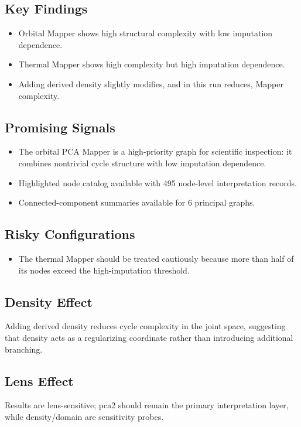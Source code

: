 \subsection*{Key Findings}
\begin{itemize}
\item Orbital Mapper shows high structural complexity with low imputation dependence.
\item Thermal Mapper shows high complexity but high imputation dependence.
\item Adding derived density slightly modifies, and in this run reduces, Mapper complexity.
\end{itemize}

\subsection*{Promising Signals}
\begin{itemize}
\item The orbital PCA Mapper is a high-priority graph for scientific inspection: it combines nontrivial cycle structure with low imputation dependence.
\item Highlighted node catalog available with 495 node-level interpretation records.
\item Connected-component summaries available for 6 principal graphs.
\end{itemize}

\subsection*{Risky Configurations}
\begin{itemize}
\item The thermal Mapper should be treated cautiously because more than half of its nodes exceed the high-imputation threshold.
\end{itemize}

\subsection*{Density Effect}
Adding derived density reduces cycle complexity in the joint space, suggesting that density acts as a regularizing coordinate rather than introducing additional branching.

\subsection*{Lens Effect}
Results are lens-sensitive; pca2 should remain the primary interpretation layer, while density/domain are sensitivity probes.


